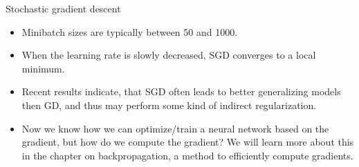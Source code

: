 \begin{vbframe}{Stochastic gradient descent}
\framebreak 


\vspace*{0.5cm}
  \begin{itemize}
    \item Minibatch sizes are typically between 50 and 1000.
    \item When the learning rate is slowly decreased, SGD converges to a local minimum.
    \item Recent results indicate, that SGD often leads to better generalizing models then GD, and thus may perform some kind of indirect regularization.
    \item Now we know how we can optimize/train a neural network based on the gradient, but how do we compute the gradient? We will learn more about this in the chapter on backpropagation, a method to efficiently compute gradients.
  \end{itemize}
\end{vbframe}


\endlecture
